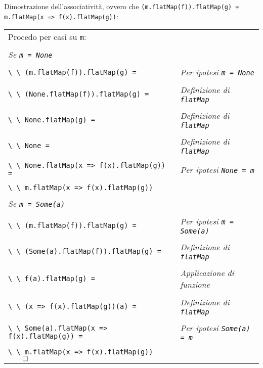 Dimostrazione dell'associatività, ovvero che \lstinline{(m.flatMap(f)).flatMap(g) = m.flatMap(x => f(x).flatMap(g))}:

\begin{tabularx}{\textwidth}{ll}
  Procedo per casi su \lstinline{m}: & \\
  & \\
  \emph{Se \lstinline{m = None}} & \\
  \\
  \lstinline{\ \ (m.flatMap(f)).flatMap(g) =} & \emph{Per ipotesi \lstinline{m = None}}\\
  \\
  \lstinline{\ \ (None.flatMap(f)).flatMap(g) =} & \emph{Definizione di \lstinline{flatMap}}\\
  \\
  \lstinline{\ \ None.flatMap(g) =} & \emph{Definizione di \lstinline{flatMap}}\\
  \\
  \lstinline{\ \ None =} & \emph{Definizione di \lstinline{flatMap}}\\
  \\
  \lstinline{\ \ None.flatMap(x => f(x).flatMap(g)) =} & \emph{Per ipotesi \lstinline{None = m}}\\
  \\
  \lstinline{\ \ m.flatMap(x => f(x).flatMap(g))} &  \\
  \\
  \emph{Se \lstinline{m = Some(a)}} & \\
  \\
  \lstinline{\ \ (m.flatMap(f)).flatMap(g) =} & \emph{Per ipotesi \lstinline{m = Some(a)}}\\
  \\
  \lstinline{\ \ (Some(a).flatMap(f)).flatMap(g) =} & \emph{Definizione di \lstinline{flatMap}}\\
  \\
  \lstinline{\ \ f(a).flatMap(g) =} & \emph{Applicazione di funzione}\\
  \\
  \lstinline{\ \ (x => f(x).flatMap(g))(a) =} & \emph{Definizione di \lstinline{flatMap}} \\
  \\
  \lstinline{\ \ Some(a).flatMap(x => f(x).flatMap(g)) =} & \emph{Per ipotesi \lstinline{Some(a) = m}} \\
  \\
  \lstinline{\ \ m.flatMap(x => f(x).flatMap(g))}$\qed$ & 
\end{tabularx}

